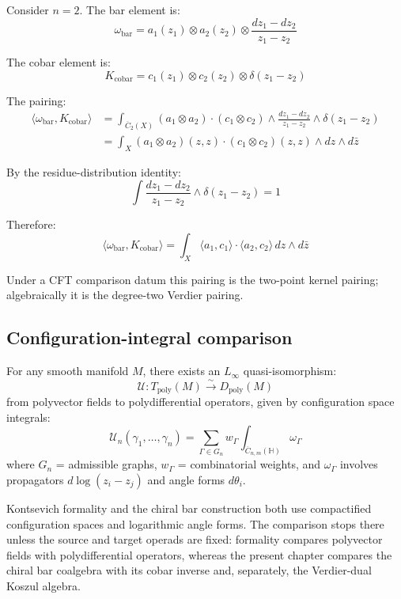 \begin{example}\label{ex:pairing-two-point}

Consider $n=2$. The bar element is:
\[\omega_{\text{bar}} = a_1(z_1) \otimes a_2(z_2) \otimes \frac{dz_1 - dz_2}{z_1 - z_2}\]

The cobar element is:
\[K_{\text{cobar}} = c_1(z_1) \otimes c_2(z_2) \otimes \delta(z_1 - z_2)\]

The pairing:
\begin{align*}
\langle \omega_{\text{bar}}, K_{\text{cobar}} \rangle &= \int_{\overline{C}_2(X)}
(a_1 \otimes a_2) \cdot (c_1 \otimes c_2) \wedge \frac{dz_1 - dz_2}{z_1 - z_2}
\wedge \delta(z_1 - z_2) \\
&= \int_X (a_1 \otimes a_2)(z, z) \cdot (c_1 \otimes c_2)(z, z) \wedge dz \wedge d\bar{z}
\end{align*}

By the residue-distribution identity:
\[\int \frac{dz_1 - dz_2}{z_1 - z_2} \wedge \delta(z_1 - z_2) = 1\]

Therefore:
\[\langle \omega_{\text{bar}}, K_{\text{cobar}} \rangle = \int_X \langle a_1, c_1
\rangle \cdot \langle a_2, c_2 \rangle \, dz \wedge d\bar{z}\]

Under a CFT comparison datum this pairing is the two-point kernel
pairing; algebraically it is the degree-two Verdier pairing.
\end{example}

\subsection{Configuration-integral comparison}

\begin{theorem}\label{thm:kontsevich-formality}
For any smooth manifold $M$, there exists an $L_\infty$
quasi-isomorphism:
\[\mathcal{U}: T_{\text{poly}}(M) \xrightarrow{\sim} D_{\text{poly}}(M)\]
from polyvector fields to polydifferential operators, given by configuration space integrals:
\[\mathcal{U}_n(\gamma_1, \ldots, \gamma_n) = \sum_{\Gamma \in G_n} w_\Gamma
\int_{\overline{C}_{n,m}(\mathbb{H})} \omega_\Gamma\]
where $G_n$ = admissible graphs, $w_\Gamma$ = combinatorial weights, and
$\omega_\Gamma$ involves propagators $d\log(z_i - z_j)$ and angle forms $d\theta_i$.
\end{theorem}

\begin{remark}\label{rem:kontsevich-chiral}
Kontsevich formality and the chiral bar construction both use
compactified configuration spaces and logarithmic angle forms. The
comparison stops there unless the source and target operads are fixed:
formality compares polyvector fields with polydifferential operators,
whereas the present chapter compares the chiral bar coalgebra with its
cobar inverse and, separately, the Verdier-dual Koszul algebra.
\end{remark}

